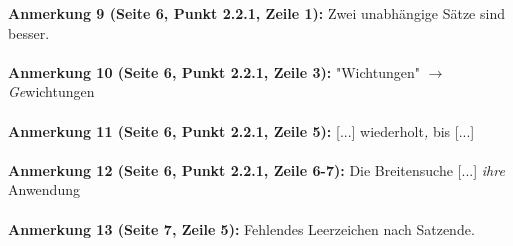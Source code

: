 \documentclass[a4paper,12pt]{book}
\begin{document}
\noindent
\textbf{Anmerkung 9 (Seite 6, Punkt 2.2.1, Zeile 1):}
Zwei unabhängige Sätze sind besser. \\
\\

\noindent
\textbf{Anmerkung 10 (Seite 6, Punkt 2.2.1, Zeile 3):}
"Wichtungen" $\rightarrow$ \emph{Ge}wichtungen \\
\\

\noindent
\textbf{Anmerkung 11 (Seite 6, Punkt 2.2.1, Zeile 5):}
[...] wiederholt\emph{,} bis [...] \\
\\

\noindent
\textbf{Anmerkung 12 (Seite 6, Punkt 2.2.1, Zeile 6-7):}
Die Breitensuche [...] \emph{ihre} Anwendung \\
\\

\noindent
\textbf{Anmerkung 13 (Seite 7, Zeile 5):}
Fehlendes Leerzeichen nach Satzende. \\
\\
\end{document}
